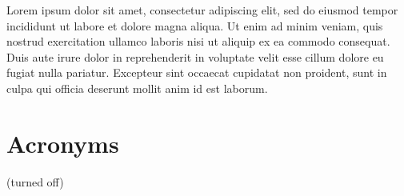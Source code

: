 \documentclass{article}
\begin{document}
Lorem ipsum dolor sit amet, consectetur adipiscing elit, sed do eiusmod tempor
incididunt ut labore et dolore magna aliqua. Ut enim ad minim veniam, quis
nostrud exercitation ullamco laboris nisi ut aliquip ex ea commodo consequat.
Duis aute irure dolor in reprehenderit in voluptate velit esse cillum dolore eu
fugiat nulla pariatur. Excepteur sint occaecat cupidatat non proident, sunt in
culpa qui officia deserunt mollit anim id est laborum.

\lstlistoflistings

\section{Acronyms}
 (turned off)

\end{document}
